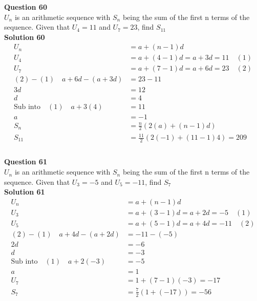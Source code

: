\documentclass{article}
\begin{document}
\noindent\textbf{Question 60}\\[5pt]
$U_n$ is an arithmetic sequence with $S_n$ being the sum of the first n terms of the sequence. Given that $U_4=11$ and $U_7=23$, find $S_{11}$\\[5pt]
\noindent\textbf{Solution 60}\\[5pt]
\begin{align*}
U_n&=a+(n-1)d\\[2pt]
U_4&=a+(4-1)d=a+3d=11\quad (1)\\[2pt]
U_7&=a+(7-1)d=a+6d=23\quad (2)\\[2pt]
(2)-(1)\quad a+6d-(a+3d)&=23-11\\[2pt]
3d&=12\\[2pt]
d&=4\\[2pt]
\text{Sub into} \quad (1) \quad a+3(4)&=11\\[2pt]
a&=-1\\[12pt]
S_n&=\displaystyle\frac{n}{2}(2(a)+(n-1)d)\\[2pt]
S_{11}&=\displaystyle\frac{11}{2}(2(-1)+(11-1)4)=209\\
\end{align*}\\[10pt]

\noindent\textbf{Question 61}\\[5pt]
$U_n$ is an arithmetic sequence with $S_n$ being the sum of the first n terms of the sequence. Given that $U_3=-5$ and $U_5=-11$, find $S_{7}$\\[5pt]
\noindent\textbf{Solution 61}\\[5pt]
\begin{align*}
U_n&=a+(n-1)d\\[2pt]
U_3&=a+(3-1)d=a+2d=-5\quad (1)\\[2pt]
U_5&=a+(5-1)d=a+4d=-11\quad (2)\\[2pt]
(2)-(1)\quad a+4d-(a+2d)&=-11-(-5)\\[2pt]
2d&=-6\\[2pt]
d&=-3\\[2pt]
\text{Sub into} \quad (1) \quad a+2(-3)&=-5\\[2pt]
a&=1\\[12pt]
U_{7}&=1+(7-1)(-3)=-17\\[2pt]
S_{7}&=\displaystyle\frac{7}{2}(1+(-17))=-56\\
\end{align*}\\[10pt]
\end{document}
